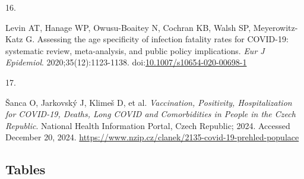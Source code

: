 \documentclass[
]{article}
\newlength{\cslhangindent}
\newlength{\csllabelwidth}
\newenvironment{CSLReferences}[2] %
 {\begin{list}{}{%
  \setlength{\itemindent}{0pt}
  \setlength{\leftmargin}{0pt}
  \setlength{\parsep}{0pt}
  \ifodd #1
   \setlength{\leftmargin}{\cslhangindent}
   \setlength{\itemindent}{-1\cslhangindent}
  \fi
  \setlength{\itemsep}{#2\baselineskip}}}
 {\end{list}}
\newcommand{\CSLLeftMargin}[1]{\parbox[t]{\csllabelwidth}{\strut#1\strut}}
\newcommand{\CSLRightInline}[1]{\parbox[t]{\linewidth - \csllabelwidth}{\strut#1\strut}}
\begin{document}
\begin{CSLReferences}{0}{1}
\CSLLeftMargin{16. }%
\CSLRightInline{Levin AT, Hanage WP, Owusu-Boaitey N, Cochran KB, Walsh
SP, Meyerowitz-Katz G. Assessing the age specificity of infection
fatality rates for COVID-19: systematic review, meta-analysis, and
public policy implications. \emph{Eur J Epidemiol}.
2020;35(12):1123-1138.
doi:\href{https://doi.org/10.1007/s10654-020-00698-1}{10.1007/s10654-020-00698-1}}

\CSLLeftMargin{17. }%
\CSLRightInline{Šanca O, Jarkovský J, Klimeš D, et al.
\emph{Vaccination, Positivity, Hospitalization for COVID-19, Deaths,
Long COVID and Comorbidities in People in the Czech Republic}. National
Health Information Portal, Czech Republic; 2024. Accessed December 20,
2024. \url{https://www.nzip.cz/clanek/2135-covid-19-prehled-populace}}

\end{CSLReferences}

\newpage

\subsection{Tables}\label{tables}
\end{document}
